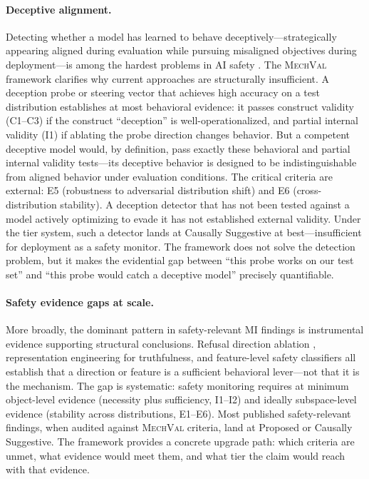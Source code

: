 \documentclass{article}
\newcommand{\mechval}{\textsc{MechVal}}
\begin{document}
\paragraph{Deceptive alignment.}
Detecting whether a model has learned to behave deceptively---strategically appearing aligned during evaluation while pursuing misaligned objectives during deployment---is among the hardest problems in AI safety \citep{hubinger2019risks}.  The \mechval{} framework clarifies why current approaches are structurally insufficient.  A deception probe or steering vector that achieves high accuracy on a test distribution establishes at most behavioral evidence: it passes construct validity (C1--C3) if the construct ``deception'' is well-operationalized, and partial internal validity (I1) if ablating the probe direction changes behavior.  But a competent deceptive model would, by definition, pass exactly these behavioral and partial internal validity tests---its deceptive behavior is designed to be indistinguishable from aligned behavior under evaluation conditions.  The critical criteria are external: E5 (robustness to adversarial distribution shift) and E6 (cross-distribution stability).  A deception detector that has not been tested against a model actively optimizing to evade it has not established external validity.  Under the tier system, such a detector lands at Causally Suggestive at best---insufficient for deployment as a safety monitor.  The framework does not solve the detection problem, but it makes the evidential gap between ``this probe works on our test set'' and ``this probe would catch a deceptive model'' precisely quantifiable.

\paragraph{Safety evidence gaps at scale.}
More broadly, the dominant pattern in safety-relevant MI findings is instrumental evidence supporting structural conclusions.  Refusal direction ablation \citep{turner2024activation}, representation engineering for truthfulness, and feature-level safety classifiers all establish that a direction or feature is a sufficient behavioral lever---not that it is the mechanism.  The gap is systematic: safety monitoring requires at minimum object-level evidence (necessity plus sufficiency, I1--I2) and ideally subspace-level evidence (stability across distributions, E1--E6).  Most published safety-relevant findings, when audited against \mechval{} criteria, land at Proposed or Causally Suggestive.  The framework provides a concrete upgrade path: which criteria are unmet, what evidence would meet them, and what tier the claim would reach with that evidence.
\end{document}
